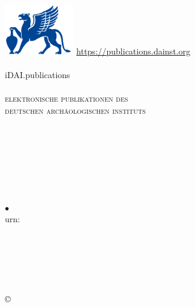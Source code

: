 \documentclass[fontsize=9pt,english,ngerman]{scrartcl}
\def\issnonlinetag{\issntagonline \mysep \eng{\issntagonline} \mybf{\issnonline}\\}
\def\inputcmd{\clearpage}
\begin{document}
\begin{flushright}
\includegraphics[width=3cm]{dailogo}\hspace*{1.9cm}%
{\tiny\href{https://publications.dainst.org}{https://publications.dainst.org}}\\[-.2em]
\myrule\\[.5em]
{\fontsize{30}{10}\selectfont iDAI.publications}\\
\myrule\\[.5em]
{\scshape elektronische publikationen des\\ deutschen archäologischen instituts}
\end{flushright}
\RaggedRight
\vspace*{4em}
\entry{\digitaloffprint}{}\\[1em]
{\huge\artauthor\\[.5em]
\mybf{\arttitle}}\\[6em]

\entry{\from}{}

{\huge\mybf{\journal}\\
\journalsubtitle\\[3em]}

\entry{\issuetag}{\issue} {$\bullet$} \mybf{\yearpub}\hfill\purl\\
\entry{\pagestag}{\pages}\hfill urn: \urn\\[1em]
\vfill
\begin{footnotesize}
\entry{\editortag}{\editor}\\
\entry{\journalurltag}{\journalurl}\\
\entry{\issntag}{\issn}\\
\issnonlinetag
\entry{\publishertag}{\publisher}\\[1em]

\copyright\,\the\year{} \copyrightdai\\[1em]
\terms\\[1em]
\eng{\terms}\\
\end{footnotesize}\inputcmd
\end{document}
